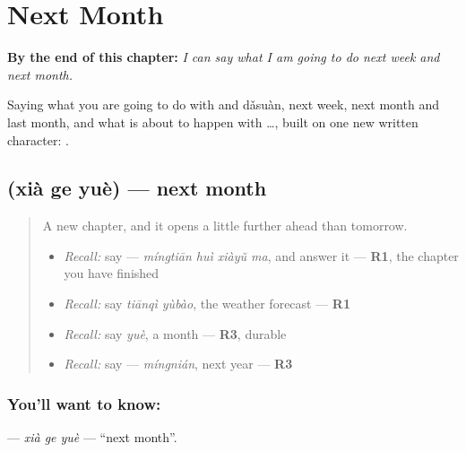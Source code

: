 
\chapter{Next Month}
\label{ch:zh-next-month}

\begin{chapteropening}
\textbf{By the end of this chapter:} \emph{I can say what I am going to do next week and next month.}

Saying what you are going to do with  and dǎsuàn, next week, next month and last month, and what is about to happen with …, built on one new written character: .
\end{chapteropening}

\section[\texorpdfstring{\zh{下个月} (xià ge yuè)}{下个月 (xià ge yuè)}]{ (xià ge yuè) — next month}

\label{lesson:ZH-C148-xia-ge-yue}



\begin{quote}
A new chapter, and it opens a little further ahead than tomorrow.

\begin{itemize}
\raggedright
  \item \emph{Recall:} say  — \emph{míngtiān huì xiàyǔ ma}, and answer it — \textbf{R1}, the chapter you have finished
  \item \emph{Recall:} say \emph{tiānqì yùbào}, the weather forecast — \textbf{R1}
  \item \emph{Recall:} say \emph{yuè}, a month — \textbf{R3}, durable
  \item \emph{Recall:} say  — \emph{míngnián}, next year — \textbf{R3}
\end{itemize}
\end{quote}

\subsection*{You'll want to know: }
\textbf{} — \emph{xià ge yuè} — \textquotedblleft{}next month\textquotedblright{}.

